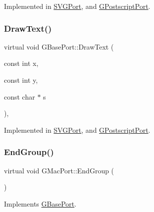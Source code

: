 Implemented in \mbox{\hyperlink{class_s_v_g_port_a16219cfcb3520433a2c402c83b7ac47b}{S\+V\+G\+Port}}, and \mbox{\hyperlink{class_g_postscript_port_a2d69a564e11b54ee7d7878ad83b45707}{G\+Postscript\+Port}}.

\mbox{\label{class_g_base_port_a9b947d2575b05f303520fbbe7fd9e350}} 
\subsubsection{\texorpdfstring{Draw\+Text()}{DrawText()}}
{\footnotesize\ttfamily virtual void G\+Base\+Port\+::\+Draw\+Text (\begin{DoxyParamCaption}\item[{const int}]{x,  }\item[{const int}]{y,  }\item[{const char $\ast$}]{s }\end{DoxyParamCaption})\hspace{0.3cm}{\ttfamily [pure virtual]}, {\ttfamily [inherited]}}



Implemented in \mbox{\hyperlink{class_s_v_g_port_a94dc5a4fee82bacdd3160ea25827d7bb}{S\+V\+G\+Port}}, and \mbox{\hyperlink{class_g_postscript_port_abdd3978e13af04f5e6db9cf28cf861a8}{G\+Postscript\+Port}}.

\mbox{\label{class_g_mac_port_a0c29e4ce61f7c281f5cc9c04930db4fc}} 
\subsubsection{\texorpdfstring{End\+Group()}{EndGroup()}}
{\footnotesize\ttfamily virtual void G\+Mac\+Port\+::\+End\+Group (\begin{DoxyParamCaption}{ }\end{DoxyParamCaption})\hspace{0.3cm}{\ttfamily [virtual]}}



Implements \mbox{\hyperlink{class_g_base_port_aa5b444d85d6bf8c88bbddb58f7ce8bd4}{G\+Base\+Port}}.

\mbox{\label{class_g_base_port_ac14e5cf72682662f8ac24c57e98b1bfa}} 
